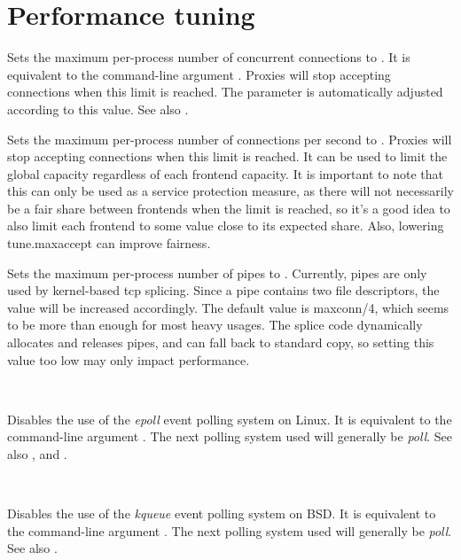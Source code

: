 
\section{Performance tuning}

\begin{keywords}

 

  Sets the maximum per-process number of concurrent connections to .
  It is equivalent to the command-line argument . Proxies will stop accepting
  connections when this limit is reached. The  parameter is
  automatically adjusted according to this value. See also .


 

  Sets the maximum per-process number of connections per second to .
  Proxies will stop accepting connections when this limit is reached. It can be
  used to limit the global capacity regardless of each frontend capacity. It is
  important to note that this can only be used as a service protection measure,
  as there will not necessarily be a fair share between frontends when the
  limit is reached, so it's a good idea to also limit each frontend to some
  value close to its expected share. Also, lowering tune.maxaccept can improve
  fairness.

 

  Sets the maximum per-process number of pipes to . Currently, pipes
  are only used by kernel-based tcp splicing. Since a pipe contains two file
  descriptors, the  value will be increased accordingly. The default
  value is maxconn/4, which seems to be more than enough for most heavy usages.
  The splice code dynamically allocates and releases pipes, and can fall back
  to standard copy, so setting this value too low may only impact performance.

 \ 

  Disables the use of the \emph{epoll} event polling system on Linux. It is
  equivalent to the command-line argument . The next polling system
  used will generally be \emph{poll}. See also , and .

 \ 

  Disables the use of the \emph{kqueue} event polling system on BSD. It is
  equivalent to the command-line argument . The next polling system
  used will generally be \emph{poll}. See also .


\end{keywords}
